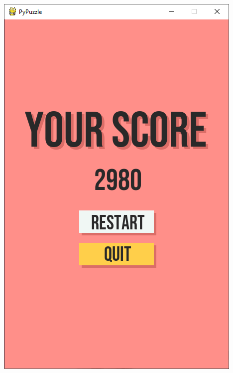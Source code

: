 \documentclass[a4paper]{report}
\begin{document}
\begin{enumerate}
        \includegraphics[scale=0.3]{images/4-endani.png}

\end{enumerate}
\end{document}

